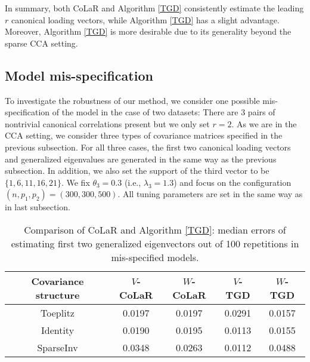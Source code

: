 \documentclass[11pt]{article}
\newcommand{\nb}[1]{\textcolor{orange}{\texttt{[#1]}}}
\newcommand{\0}{{\mathbf{0}}}
\begin{document}
In summary, both CoLaR and Algorithm \ref{TGD} consistently estimate the leading $r$ canonical loading vectors, while Algorithm \ref{TGD} has a slight advantage. 
Moreover,
Algorithm \ref{TGD} is more desirable due to its generality beyond the sparse CCA setting. 

\subsection{Model mis-specification}
\label{sec:misspec}
To investigate the robustness of our method, we consider one possible mis-specification of the model in the case of two datasets: 
There are 3 pairs of nontrivial canonical correlations present but we only set $r=2$.  
As we are in the CCA setting, we consider three types of covariance matrices specified in the previous subsection. 
For all three cases, the first two canonical loading vectors and generalized eigenvalues are generated in the same way as the previous subsection.
In addition, we also set the support of the third vector to be $\{1,6,11,16,21\}$. 
We fix $\theta_3=0.3$ (i.e., $\lambda_3 = 1.3$)
and focus on the configuration $(n,p_1,p_2)=(300,300,500)$. 
All tuning parameters are set in the same way as in last subsection. 

\begin{table}[!tb]
\centering
\begin{tabular}{c|cc|cc}
\hline
{{{Covariance structure}}} &  {$V$-CoLaR} &  {$W$-CoLaR} &  {$V$-TGD} &  {$W$-TGD} \\ \hline
{Toeplitz}                  & 0.0197           & 0.0197           & 0.0291         & 0.0157         \\ 
{Identity}                  & 0.0190           & 0.0195           &        0.0113        &    0.0155            \\ 
{SparseInv}                 & 0.0348           & 0.0263           & 0.0112         & 0.0488         \\ \hline
\end{tabular}
\caption{Comparison of CoLaR and Algorithm \ref{TGD}: median errors of estimating first two generalized eigenvectors out of 100 repetitions in mis-specified models.}
\label{simcca4}
\end{table}
\end{document}

